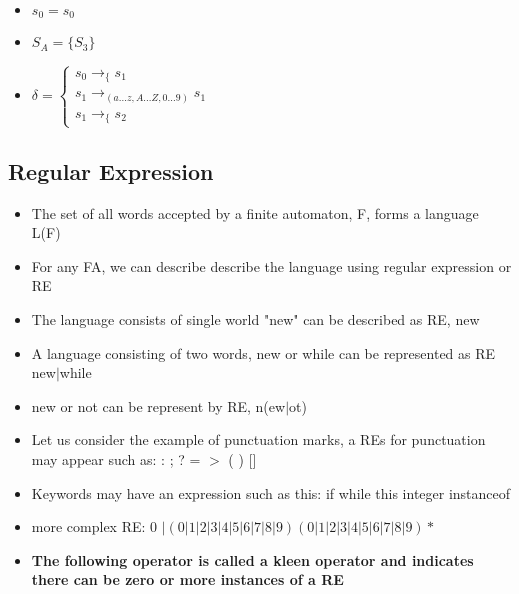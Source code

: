 \documentclass[20pt]{article}
\begin{document}
\begin{itemize}
\begin{itemize}
                    \item $s_0 = s_0 $
                    \item $S_A = \{S_3 \}$
                    \item $\delta = \begin{cases}
                        s_0 \rightarrow_{\{} s_1\\
                        s_1 \rightarrow_{(a...z,A...Z,0...9)} s_1\\
                        s_1 \rightarrow_\{ s_2
                    \end{cases}$
                  \end{itemize}
                  \end{itemize}
    \subsection*{Regular Expression}
                  \begin{itemize} 
                    \item The set of all words accepted by a finite automaton, F, forms a language L(F)
                    \item For any FA, we can describe describe the language using regular expression or RE
                    \item The language consists of single world "new" can be described as RE, new 
                    \newpage
                    \item A language consisting of two words, new or while can be represented as RE new$|$while
                    \item new or not can be represent by RE, n(ew$|$ot)
                    \item Let us consider the example of punctuation marks, a REs for punctuation may appear such as: : ; ? = $>$ ( ) {} []
                    \item Keywords may have an expression such as this: if while this integer instanceof
                    \item more complex RE: 0 $|(0|1|2|3|4|5|6|7|8|9) (0|1|2|3|4|5|6|7|8|9)*$
                    \item \textbf{The following operator is called a kleen operator and indicates there can be zero or more instances of a RE} 
                \end{itemize}

      
\end{document}
